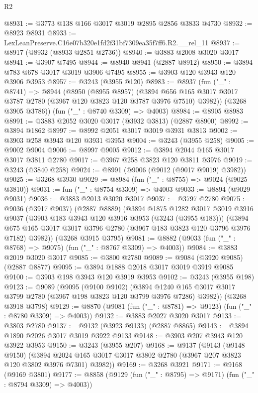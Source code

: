 \begin{lexlean}{R2}
\begin{coremodule}
@8931 := @3773 @138 @166 @3017 @3019 @2895 @2856 @3833 @4730
@8932 := @8923 @8931
@8933 := LexLeanPreserve.C16e07b320e1fd2f31bf7309ea35f7ff6.R2.__rel_11
@8937 := @8917 (@8932 (@8933 @2851 @2736))
@8940 := @3883 @2008 @3020 @3017
@8941 := @3907 @7495
@8944 := @8940 @8941 (@2887 @8912)
@8950 := @3894 @783 @678 @3017 @3019 @3906 @7495
@8955 := @3903 @120 @3943 @120 @3906 @3953
@8957 := @3243 (@3955 @120)
@8983 := @8937
    (fun ("_" : @8741) =>
    @8944
      (@8950
        (@8955 @8957)
        (@3894 @656 @165 @3017 @3017 @3787 @2780 (@3967 @120 @3823 @120 @3787 @3976 @7510) @3982))
      (@3268 @3905 @3786))
    (fun ("_" : @8740 @3309) => @4003)
@8984 := @8905 @8983
@8991 := @3883 @2052 @3020 @3017 (@3932 @3813) (@2887 @8900)
@8992 := @3894 @1862
@8997 := @8992 @2051 @3017 @3019 @3931 @3813
@9002 := @3903 @258 @3943 @120 @3931 @3953
@9004 := @3243 (@3955 @258)
@9005 := @9002 @9004
@9006 := @8997 @9005
@9012 := @3894 @2044 @165 @3017 @3017 @3811 @2780
@9017 := @3967 @258 @3823 @120 @3811 @3976
@9019 := @3243 (@3840 @258)
@9024 := @8991 (@9006 (@9012 (@9017 @9019) @3982))
@9025 := @3268 @3930
@9029 := @8984 (fun ("_" : @8755) => @9024 (@9025 @3810))
@9031 := fun ("_" : @8754 @3309) => @4003
@9033 := @8894 (@9029 @9031)
@9036 := @3883 @2013 @3020 @3017
@9037 := @3797 @2780
@9075 := @9036
    (@3917 @9037)
    (@2887 @8889)
    (@3894
      @1875
      @1282
      @3017
      @3019
      @3916
      @9037
      (@3903 @183 @3943 @120 @3916 @3953 (@3243 (@3955 @183)))
      (@3894 @675 @165 @3017 @3017 @3796 @2780 (@3967 @183 @3823 @120 @3796 @3976 @7182) @3982))
    (@3268 @3915 @3795)
@9081 := @8882 (@9033 (fun ("_" : @8768) => @9075) (fun ("_" : @8767 @3309) => @4003))
@9084 := @3883 @2019 @3020 @3017
@9085 := @3800 @2780
@9089 := @9084 (@3920 @9085) (@2887 @8877)
@9095 := @3894 @1888 @2018 @3017 @3019 @3919 @9085
@9100 := @3903 @198 @3943 @120 @3919 @3953
@9102 := @3243 (@3955 @198)
@9123 := @9089
    (@9095
      (@9100 @9102)
      (@3894 @1240 @165 @3017 @3017 @3799 @2780 (@3967 @198 @3823 @120 @3799 @3976 @7286) @3982))
    (@3268 @3918 @3798)
@9129 := @8870 (@9081 (fun ("_" : @8781) => @9123) (fun ("_" : @8780 @3309) => @4003))
@9132 := @3883 @2027 @3020 @3017
@9133 := @3803 @2780
@9137 := @9132 (@3923 @9133) (@2887 @8865)
@9143 := @3894 @1890 @2026 @3017 @3019 @3922 @9133
@9148 := @3903 @207 @3943 @120 @3922 @3953
@9150 := @3243 (@3955 @207)
@9168 := @9137
    (@9143
      (@9148 @9150)
      (@3894 @2024 @165 @3017 @3017 @3802 @2780 (@3967 @207 @3823 @120 @3802 @3976 @7301) @3982))
@9169 := @3268 @3921
@9171 := @9168 (@9169 @3801)
@9177 := @8858 (@9129 (fun ("_" : @8795) => @9171) (fun ("_" : @8794 @3309) => @4003))

\end{coremodule}
\end{lexlean}
